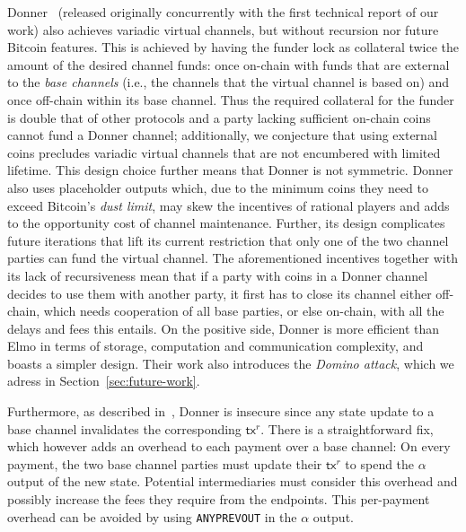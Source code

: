   Donner~\cite{donner}
    (released originally concurrently with the first technical report of our work) 
also achieves variadic
  virtual channels, but without recursion nor future Bitcoin features. This is
  achieved by having the funder lock as
  collateral twice the amount of the desired channel funds: once on-chain with
  funds that are external to the \emph{base channels} (i.e., the channels that the
  virtual channel is based on) and once off-chain within its base channel. Thus
  the required collateral for the funder is double that of other protocols and
  a party lacking sufficient on-chain coins cannot fund a Donner channel;
  additionally, we conjecture that using external coins precludes variadic
  virtual channels that are not encumbered with limited lifetime. This
  design choice further means that Donner is not symmetric. Donner also uses
  placeholder outputs which, due to the minimum coins they need to
  exceed Bitcoin's \emph{dust limit}, may skew the incentives of rational players
  and adds to the
  opportunity cost of channel maintenance. Further, its design complicates
  future iterations that lift its current restriction that only one of the two
  channel parties can fund the virtual channel. The aforementioned incentives
  together with its lack of recursiveness mean that if a party with coins in a
  Donner channel decides to use them with another party, it first has to close
  its channel either off-chain, which needs cooperation of all base parties, or
  else on-chain, with all the delays and fees this entails.
  On the positive side, Donner is
  more efficient than Elmo in terms of storage, computation and communication
  complexity, and boasts a simpler design. 
  Their work also introduces the \emph{Domino attack},
  which we adress in Section~\ref{sec:future-work}.

  Furthermore, as described in~\cite{donner}, Donner
  is insecure since any state update to a base
  channel invalidates the corresponding $\mathsf{tx}^r$. There is a
  straightforward fix, which however adds an overhead to each payment over
  a base channel: On every payment, the two base channel parties must update
  their $\mathsf{tx}^r$ to spend the $\alpha$ output of the new state. Potential
  intermediaries must consider this overhead and possibly increase the fees they
  require from the endpoints. This per-payment overhead can be avoided by using
  \texttt{ANYPREVOUT} in the $\alpha$ output.

